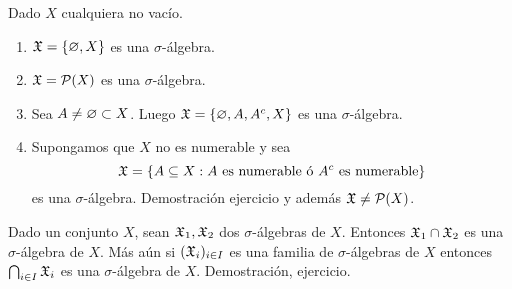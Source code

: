 \begin{eg}
    Dado $X$ cualquiera no vacío.
    \begin{enumerate}
        \item $\mathfrak{X} = \{ \varnothing, X \}$ es una $\sigma$-álgebra.
        \item $\mathfrak{X} = \mathcal{P}(X)$ es una $\sigma$-álgebra.
        \item Sea $A \neq \varnothing \subset X$. Luego $\mathfrak{X} = \{ \varnothing, A, A^c, X \}$ es una $\sigma$-álgebra.
        \item Supongamos que $X$ no es numerable y sea
              \begin{equation}
                  \mathfrak{X} = \{ A \subseteq X : A \text{ es numerable ó } A^c \text{ es numerable} \}
              \end{equation}
              es una $\sigma$-álgebra. Demostración ejercicio y además $\mathfrak{X} \neq \mathcal{P}(X)$.
    \end{enumerate}
\end{eg}

\begin{lemma}
    Dado un conjunto $X$, sean $\mathfrak{X}_1, \mathfrak{X}_2$ dos $\sigma$-álgebras de $X$. Entonces $\mathfrak{X}_1 \cap \mathfrak{X}_2$ es una $\sigma$-álgebra de $X$.
    Más aún si $(\mathfrak{X}_i)_{i \in I}$ es una familia de $\sigma$-álgebras de $X$ entonces $\bigcap_{i \in I} \mathfrak{X}_i$ es una $\sigma$-álgebra de $X$.
    Demostración, ejercicio.
\end{lemma}

\clearpage

